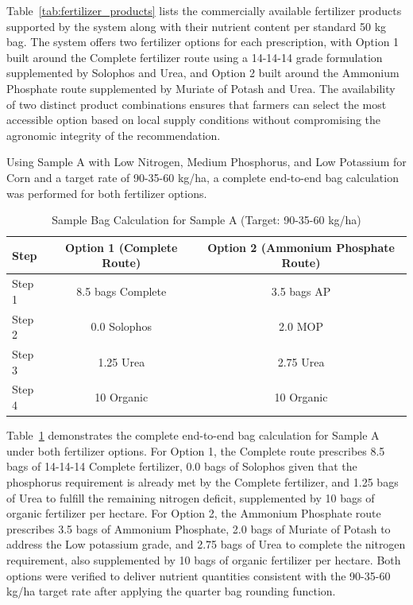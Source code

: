 {	Table~\ref{tab:fertilizer_products} lists the commercially available fertilizer products supported by the system along with their nutrient content per standard 50 kg bag. The system offers two fertilizer options for each prescription, with Option 1 built around the Complete fertilizer route using a 14-14-14 grade formulation supplemented by Solophos and Urea, and Option 2 built around the Ammonium Phosphate route supplemented by Muriate of Potash and Urea. The availability of two distinct product combinations ensures that farmers can select the most accessible option based on local supply conditions without compromising the agronomic integrity of the recommendation.
	
	Using Sample A with Low Nitrogen, Medium Phosphorus, and Low Potassium for Corn and a target rate of 90-35-60 kg/ha, a complete end-to-end bag calculation was performed for both fertilizer options.
	
	\begin{table}[H]
		\centering
		\caption{Sample Bag Calculation for Sample A (Target: 90-35-60 kg/ha)}
		\label{tab:bag_calc_sampleA}
		\renewcommand{\arraystretch}{1.2}
		\begin{tabular}{lcc}
			\toprule
			Step & Option 1 (Complete Route) & Option 2 (Ammonium Phosphate Route) \\
			\midrule
			Step 1 & 8.5 bags Complete & 3.5 bags AP \\
			Step 2 & 0.0 Solophos & 2.0 MOP \\
			Step 3 & 1.25 Urea & 2.75 Urea \\
			Step 4 & 10 Organic & 10 Organic \\
			\bottomrule
		\end{tabular}
	\end{table}
	
	Table~\ref{tab:bag_calc_sampleA} demonstrates the complete end-to-end bag calculation for Sample A under both fertilizer options. For Option 1, the Complete route prescribes 8.5 bags of 14-14-14 Complete fertilizer, 0.0 bags of Solophos given that the phosphorus requirement is already met by the Complete fertilizer, and 1.25 bags of Urea to fulfill the remaining nitrogen deficit, supplemented by 10 bags of organic fertilizer per hectare. For Option 2, the Ammonium Phosphate route prescribes 3.5 bags of Ammonium Phosphate, 2.0 bags of Muriate of Potash to address the Low potassium grade, and 2.75 bags of Urea to complete the nitrogen requirement, also supplemented by 10 bags of organic fertilizer per hectare. Both options were verified to deliver nutrient quantities consistent with the 90-35-60 kg/ha target rate after applying the quarter bag rounding function.
	
}
